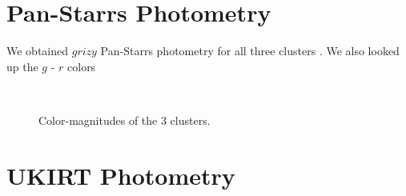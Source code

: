 \documentclass{aastex6}
\begin{document}
\section{Pan-Starrs Photometry}

We obtained $grizy$ Pan-Starrs photometry for all three clusters \citep{magnier2013photLadder,schlafly2012photcal,tonry2012panstarrsPhot}.
We also looked up the $g$ - $r$ colors

\begin{figure}[!t]
\centering
{}
\\
	\caption{Color-magnitudes of the 3 clusters.}
	\label{fig:cmdPS}
\end{figure} 

\section{UKIRT Photometry}
\end{document}
